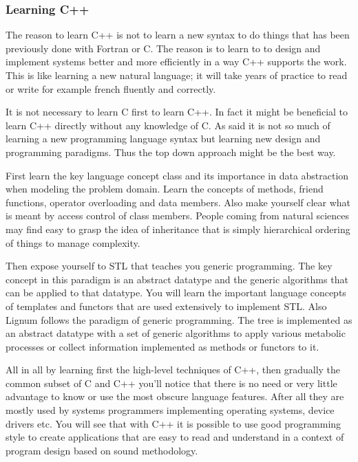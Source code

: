 \subsubsection{Learning C++} 

The reason to learn C++ is not to learn a new syntax to do things that
has been previously done with Fortran  or C. The reason is to learn to
to design and  implement systems better and more  efficiently in a way
C++ supports the work.  This  is like learning a new natural language;
it will  take years of  practice to read  or write for  example french
fluently and correctly.

It is not necessary to learn C first to learn C++. In fact it might be
beneficial to learn  C++ directly without any knowledge  of C. As said
it is  not so much of  learning a new programming  language syntax but
learning  new design  and programming  paradigms.  Thus  the  top down
approach might be the best  way.  

First learn the key language  concept class and its importance in data
abstraction when  modeling the problem domain.  Learn  the concepts of
methods, friend functions, operator overloading and data members. Also
make yourself clear what is  meant by access control of class members.
People coming from natural sciences may find easy to grasp the idea of
inheritance that  is simply hierarchical ordering of  things to manage
complexity.

Then expose yourself to STL that teaches you generic programming.  The
key concept in  this paradigm is an abstract  datatype and the generic
algorithms that can  be applied to that datatype.   You will learn the
important language  concepts of templates  and functors that  are used
extensively  to implement  STL. Also  Lignum follows  the  paradigm of
generic programming.  The tree is implemented as  an abstract datatype
with a set of generic  algorithms to apply various metabolic processes
or collect information implemented as methods or functors to it.

All in  all by learning first  the high-level techniques  of C++, then
gradually the common  subset of C and C++ you'll  notice that there is
no  need or  very little  advantage to  know or  use the  most obscure
language  features.   After  all  they  are  mostly  used  by  systems
programmers  implementing operating systems,  device drivers  etc. You
will see that with C++ it is possible to use good programming style to
create applications that are easy  to read and understand in a context
of program design based on sound methodology.
   
